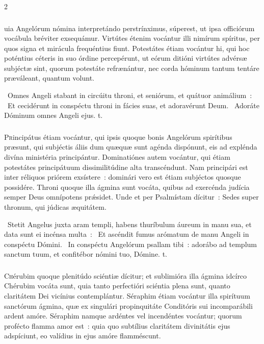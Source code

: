 \documentclass[9pt,twoside]{extarticle}
\begin{document}
\begin{multicols}{2}
{\subsubsection*{\center {}}
uia Angelórum nómina interpretándo perstrínximus, súperest, ut ipsa officiórum vocábula bréviter exsequámur. Virtútes étenim vocántur illi nimírum spíritus, per quos signa et mirácula frequéntius fiunt. Potestátes étiam vocántur hi, qui hoc poténtius céteris in suo órdine percepérunt, ut eórum ditióni virtútes advérsæ subjéctæ sint, quorum potestáte refrænántur, nec corda hóminum tantum tentáre præváleant, quantum volunt.

\begin{tightlist}{}
\item {}~Omnes Angeli stabant in circúitu throni, et seniórum, et quátuor animálium~: \textred{*}~Et cecidérunt in conspéctu throni in fácies suas, et adoravérunt Deum. ~Adoráte Dóminum omnes Angeli ejus. t.
\end{tightlist}

\subsubsection*{\center {}}
\lettrine{P}rincipátus étiam vocántur, qui ipsis quoque bonis Angelórum spirítibus præsunt, qui subjéctis áliis dum quæquæ sunt agénda dispónunt, eis ad explénda divína ministéria principántur. Dominatiónes autem vocántur, qui étiam potestátes principátuum dissimilitúdine alta transcéndunt. Nam principári est inter réliquos priórem exsístere~: dominári vero est étiam subjéctos quosque possidére. Throni quoque illa ágmina sunt vocáta, quibus ad exercénda judícia semper Deus omnípotens prǽsidet. Unde et per Psalmístam dícitur~: Sedes super thronum, qui júdicas æquitátem.

\begin{tightlist}{}
\item {}~Stetit Angelus juxta aram templi, habens thuríbulum áureum in manu sua, et data sunt ei incénsa multa~: \textred{*}~Et ascéndit fumus arómatum de manu Angeli in conspéctu Dómini. ~In conspéctu Angelórum psallam tibi~: adorábo ad templum sanctum tuum, et confitébor nómini tuo, Dómine. t.
\end{tightlist}

\subsubsection*{\center {}}
\lettrine{C}hérubim quoque plenitúdo sciéntiæ dícitur; et sublimióra illa ágmina idcírco Chérubim vocáta sunt, quia tanto perfectióri sciéntia plena sunt, quanto claritátem Dei vicínius contemplántur. Séraphim étiam vocántur illa spirítuum sanctórum ágmina, quæ ex singulári propinquitáte Conditóris sui incomparábili ardent amóre. Séraphim namque ardéntes vel incendéntes vocántur; quorum profécto flamma amor est~: quia quo subtílius claritátem divinitátis ejus adspíciunt, eo valídius in ejus amóre flamméscunt.

}
\end{multicols}
\end{document}
